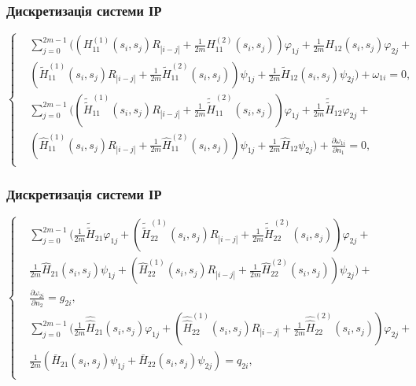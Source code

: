 \documentclass[10pt]{beamer}
\begin{document}
\begin{frame}
\frametitle{Дискретизація системи ІР}

\begin{equation} \label{lastSys1}
  \left\{
  \begin{split}
  	&\sum_{j=0}^{2m-1}\bigg((H^{(1)}_{11}(s_i, s_j)R_{|i-j|}+\frac{1}{2m}H^{(2)}_{11}(s_i, s_j))\varphi_{1j}+\frac{1}{2m}H_{12}(s_i, s_j)\varphi_{2j} +\\
	&(\tilde{H}^{(1)}_{11}(s_i, s_j)R_{|i-j|}+\frac{1}{2m}\tilde{H}^{(2)}_{11}(s_i, s_j))\psi_{1j}+\frac{1}{2m}\tilde{H}_{12}(s_i, s_j)\psi_{2j}\bigg) + \omega_{1i}=0, \\
	 &\sum_{j=0}^{2m-1}\bigg((\tilde{\tilde{H}}^{(1)}_{11}(s_i, s_j)R_{|i-j|}+\frac{1}{2m}\tilde{\tilde{H}}^{(2)}_{11}(s_i, s_j))\varphi_{1j} +\frac{1}{2m}\tilde{\tilde{H}}_{12}\varphi_{2j}+\\
	 &(\hat{H}^{(1)}_{11}(s_i, s_j)R_{|i-j|}+\frac{1}{2m}\hat{H}^{(2)}_{11}(s_i, s_j))\psi_{1j}+\frac{1}{2m}\hat{H}_{12}\psi_{2j}\bigg) +\frac{\partial\omega_{1i}}{\partial n_1}=0,\\
\end{split}
\right.
\end{equation}

\end{frame}

\begin{frame}
\frametitle{Дискретизація системи ІР}

\begin{equation} \label{lastSys2}
  \left\{
  \begin{split}
	 &\sum_{j=0}^{2m-1}\bigg(\frac{1}{2m}\tilde{\tilde{H}}_{21}\varphi_{1j}+(\tilde{\tilde{H}}^{(1)}_{22}(s_i, s_j)R_{|i-j|}+\frac{1}{2m}\tilde{\tilde{H}}^{(2)}_{22}(s_i, s_j))\varphi_{2j} +\\
	 & \frac{1}{2m}\hat{H}_{21}(s_i, s_j)\psi_{1j}+(\hat{H}^{(1)}_{22}(s_i, s_j)R_{|i-j|}+\frac{1}{2m}\hat{H}^{(2)}_{22}(s_i, s_j))\psi_{2j}\bigg) +\\
	 &\frac{\partial\omega_{2i}}{\partial n_2}=g_{2i},\\
	 &\sum_{j=0}^{2m-1}\bigg(\frac{1}{2m}\hat{\hat{H}}_{21}(s_i, s_j)\varphi_{1j}+(\hat{\hat{H}}^{(1)}_{22}(s_i, s_j)R_{|i-j|}+\frac{1}{2m}\hat{\hat{H}}^{(2)}_{22}(s_i, s_j))\varphi_{2j} +\\
	 & \frac{1}{2m}(\bar{H}_{21}(s_i, s_j)\psi_{1j}+\bar{H}_{22}(s_i, s_j)\psi_{2j})=q_{2i},\\
\end{split}
\right.
\end{equation}

\end{frame}
\end{document}
